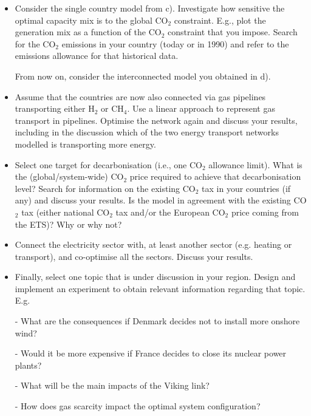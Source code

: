 \documentclass[10pt]{article}
\begin{document}
\begin{itemize}
	
\item[f)] Consider the single country model from c). Investigate how sensitive the optimal capacity mix is to the global CO$_2$ constraint. E.g., plot the generation mix as a function of the CO$_2$ constraint that you impose. Search for the CO$_2$ emissions in your country (today or in 1990) and refer to the emissions allowance for that historical data.

From now on, consider the interconnected model you obtained in d).
	

\item[g)] Assume that the countries are now also connected via gas pipelines transporting either H$_2$ or CH$_4$. Use a linear approach to represent gas transport in pipelines. Optimise the network again and discuss your results, including in the discussion which of the two energy transport networks modelled is transporting more energy. 


\item[h)] Select one target for decarbonisation (i.e., one CO$_2$ allowance limit). What is the (global/system-wide) CO$_2$ price required to achieve that decarbonisation level? Search for information on the existing CO$_2$ tax in your countries (if any) and discuss your results. Is the model in agreement with the existing CO$_2$ tax (either national CO$_2$ tax and/or the European CO$_2$ price coming from the ETS)? Why or why not?
 
\item[i)] Connect the electricity sector with, at least another sector (e.g. heating or transport), and co-optimise all the sectors. Discuss your results.

\item[j)] Finally, select one topic that is under discussion in your region. Design and implement an experiment to obtain relevant information regarding that topic. E.g.

- What are the consequences if Denmark decides not to install more onshore wind?

- Would it be more expensive if France decides to close its nuclear power plants?

- What will be the main impacts of the Viking link?

- How does gas scarcity impact the optimal system configuration? 

\end{itemize}
\end{document}
